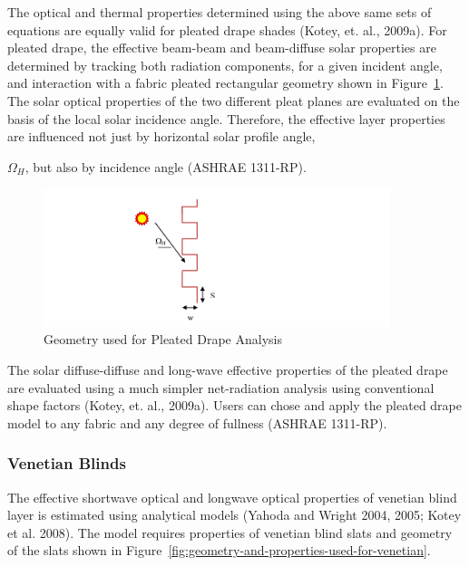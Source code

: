 The optical and thermal properties determined using the above same sets of equations are equally valid for pleated drape shades (Kotey, et. al., 2009a). For pleated drape, the effective beam-beam and beam-diffuse solar properties are determined by tracking both radiation components, for a given incident angle, and interaction with a fabric pleated rectangular geometry shown in Figure~\ref{fig:geometry-used-for-pleated-drape-analysis}. The solar optical properties of the two different pleat planes are evaluated on the basis of the local solar incidence angle. Therefore, the effective layer properties are influenced not just by horizontal solar profile angle, {$\Omega$\(_{H}\), but also by incidence angle (ASHRAE 1311-RP).

\begin{figure}[hbtp] %
\centering
\includegraphics[width=0.9\textwidth, height=0.9\textheight, keepaspectratio=true]{media/image1844.svg.png}
\caption{Geometry used for Pleated Drape Analysis \protect \label{fig:geometry-used-for-pleated-drape-analysis}}
\end{figure}

The solar diffuse-diffuse and long-wave effective properties of the pleated drape are evaluated using a much simpler net-radiation analysis using conventional shape factors (Kotey, et. al., 2009a). Users can chose and apply the pleated drape model to any fabric and any degree of fullness (ASHRAE 1311-RP).

\subsubsection{Venetian Blinds}\label{venetian-blinds}

The effective shortwave optical and longwave optical properties of venetian blind layer is estimated using analytical models (Yahoda and Wright 2004, 2005; Kotey et al. 2008). The model requires properties of venetian blind slats and geometry of the slats shown in Figure~\ref{fig:geometry-and-properties-used-for-venetian}.

}
